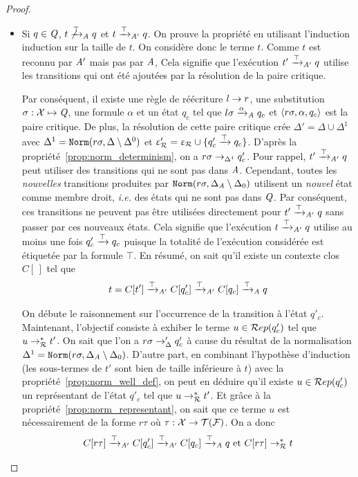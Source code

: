 \begin{proof}
\begin{enumerate}
\begin{itemize}
  \item Si $q\in\mathit Q$, $t \not\xrightarrow{\top}_\mathit A q$ et $t \xrightarrow{\top}_{\mathit A'} q$. On prouve la propriété en utilisant l'induction
    induction sur la taille de $t$. On considère donc le terme $t$. Comme $t$ est reconnu
    par $\mathit A'$ mais pas par $\mathit A$, Cela signifie que l'exécution $t' \xrightarrow{\top}_{\mathit A'} q$ utilise
    les transitions qui ont été ajoutées par la résolution de la paire critique.
    
    Par conséquent, il existe une règle de réécriture $l \rightarrow r$, une substitution $\sigma:\mathcal X \mapsto \mathit Q$,
    une formule $\alpha$ et un état  $q_c$ tel que $l\sigma \xrightarrow{\alpha}_\mathit A q_c$ et $\langle
    r\sigma, \alpha, q_c\rangle$ est la paire critique. De plus, la résolution de cette paire
    critique crée $\Delta'= \Delta \cup \Delta^1$ avec $\Delta^1 = \mathtt{Norm}(r\sigma,\Delta \setminus \Delta^0)$
    et $\upvarepsilon_{\mathcal R}'=\upvarepsilon_{\mathcal R} \cup \{q'_c \xrightarrow{\top} q_c\}$.
    D'après la propriété~\ref{prop:norm_determinism}, on a $r\sigma \rightarrow_{\Delta^1} q'_c$.
    Pour rappel, $t' \xrightarrow{\top}_{\mathit A'} q$ peut utiliser des transitions qui ne sont pas dans $\mathit A$. 
    Cependant, toutes les {\em nouvelles} transitions produites par
    $\mathtt{Norm}(r\sigma,\Delta_\mathit A\setminus \Delta_0)$ utilisent un {\em nouvel} état comme membre droit,
    \textit{i.e.} des états qui ne sont pas dans $\mathit Q$. Par conséquent, ces transitions
    ne peuvent pas être utilisées directement pour $t' \xrightarrow{\top}_{\mathit A'} q$ sans passer par ces nouveaux états. Cela signifie
    que l'exécution  $t \xrightarrow{\top}_{\mathit A'} q$ utilise au moins une fois $q'_c \xrightarrow{\top} q_c$
    puisque la totalité de l'exécution considérée est étiquetée par la formule $\top$. 
    En résumé, on sait qu'il existe un contexte clos $C[\,]$ tel que
    \[t=C[t'] \xrightarrow{\top}_{\mathit A'} C[q'_c] \xrightarrow{\top}_{\mathit A'} C[q_c] \xrightarrow{\top}_\mathit A q\]

    On débute le raisonnement sur l'occurrence de la transition à l'état $q'_c$. 
    Maintenant, l'objectif consiste à exhiber le terme $u\in \mathcal R ep(q_c')$ tel que $u \rightarrow_\mathcal R^* t'$. 
    On sait que l'on a $r\sigma \rightarrow_\Delta' q'_c$ à cause du résultat de la normalisation $\Delta^1= \mathtt{Norm}(r\sigma,\Delta_\mathit A\setminus \Delta_0)$.
    D'autre part, en combinant l'hypothèse d'induction (les sous-termes de $t'$ sont bien de taille inférieure à $t$) avec la propriété~\ref{prop:norm_well_def},
    on peut en déduire qu'il existe $u \in \mathcal R ep(q_c')$ un représentant de l'état $q'_c$ tel que $u \rightarrow_\mathcal R^* t'$.
    Et grâce à la propriété~\ref{prop:norm_representant}, on sait que ce terme $u$ est nécessairement de la forme $r\tau$ où $\tau : \mathcal X \rightarrow \mathcal{T(F)}$.
    On a donc
    \[ C[r\tau] \xrightarrow{\top}_{\mathit A'} C[q'_c] \xrightarrow{\top}_{\mathit A'} C[q_c] \xrightarrow{\top}_\mathit A q \textrm{ et } C[r\tau] \rightarrow_\mathcal R^* t \]
    

\end{itemize}
\end{enumerate}
\end{proof}
